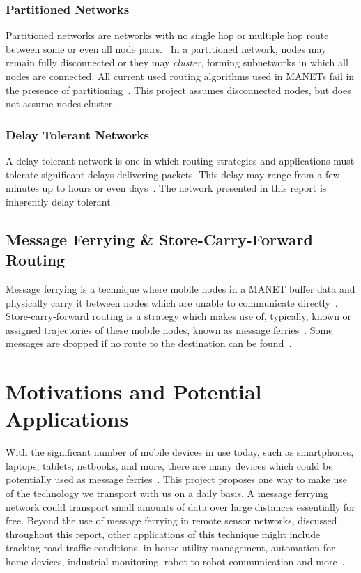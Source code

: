 \subsubsection{Partitioned Networks}
\label{sec:clustering}
Partitioned networks are networks with no single hop or multiple hop route between some or even all node pairs.~\cite{hybrid}
In a partitioned network, nodes may remain fully disconnected or they may \emph{cluster}, forming subnetworks in which all nodes are connected.
All current used routing algorithms used in MANETs %
fail in the presence of partitioning~\cite{Routing}.
This project assumes disconnected nodes, but does not assume nodes cluster.

\subsubsection{Delay Tolerant Networks}
\label{sec:delay_loss_tolerant}
A delay tolerant network is one in which routing strategies and applications must tolerate significant delays delivering packets.
This delay may range from a few minutes up to hours or even days~\cite{Routing}.
The network presented in this report is inherently delay tolerant.

\subsection{Message Ferrying \& Store-Carry-Forward Routing}
\label{sec:ferrying_overview}
Message ferrying is a technique where mobile nodes in a MANET buffer data and physically carry it between nodes which are unable to communicate directly~\cite{adhocmsgferry}.
Store-carry-forward routing is a strategy which makes use of, typically, known or assigned trajectories of these mobile nodes, known as message ferries~\cite{Routing}.
Some messages are dropped if no route to the destination can be found~\cite{implement}.

\section{Motivations and Potential Applications}
\label{sec:motivations}

With the significant number of mobile devices in use today, such as smartphones, laptops, tablets, netbooks, and more, there are many devices which could be potentially used as message ferries~\cite{wearable}.
This project proposes one way to make use of the technology we transport with us on a daily basis.
A message ferrying network could transport small amounts of data over large distances essentially for free.
Beyond the use of message ferrying in remote sensor networks, discussed throughout this report, other applications of this technique might include tracking road traffic conditions, in-house utility management, automation for home devices, industrial monitoring, robot to robot communication and more~\cite{book1}.

